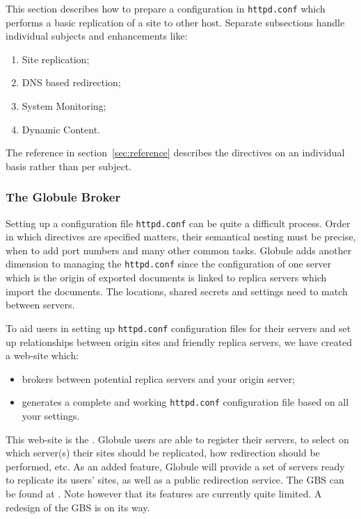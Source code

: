 \documentclass[10pt,a4paper]{article}
\makeatletter
\newenvironment{p}{\@open{P}{}}{\@close{P}}
\newenvironment{p}{}{\par}
\makeatother
\begin{document}
\begin{p}
This section describes how to prepare a configuration in \verb!httpd.conf!
which performs a basic replication of a site to other host.  Separate
subsections handle individual subjects and enhancements like:

\begin{enumerate}
\item Site replication;
\item DNS based redirection;
\item System Monitoring;
\item Dynamic Content.
\end{enumerate}

The reference in section~\ref{sec:reference} describes the directives on an
individual basis rather than per subject.
\end{p}

\subsubsection*{\label{sec:conf:gbs}The Globule Broker}

\begin{p}
Setting up a configuration file \verb!httpd.conf! can be quite a difficult
process.  Order in which directives are specified matters, their semantical
nesting must be precise, when to add port numbers and many other common tasks.
Globule adds another dimension to managing the \verb!httpd.conf! since the
configuration of one server which is the origin of exported documents is
linked to replica servers which import the documents.  The locations, shared
secrets and settings need to match between servers.
\end{p}

\begin{p}
To aid users in setting up \verb!httpd.conf! configuration files for their
servers and set up relationships between origin sites and friendly replica
servers, we have created a web-site which:
\begin{itemize}
\item brokers between potential replica servers and your origin server;
\item generates a complete and working \verb!httpd.conf! configuration file
  based on all your settings.
\end{itemize}
This web-site is the .  Globule users are able to register their servers, to select
on which server(s) their sites should be replicated, how redirection should be
performed, etc.  As an added feature, Globule will provide a set of servers
ready to replicate its users' sites, as well as a public redirection service.
The GBS can be found at
.  Note however
that its features are currently quite limited.  A redesign of the GBS is on
its way.
\end{p}
\end{document}
